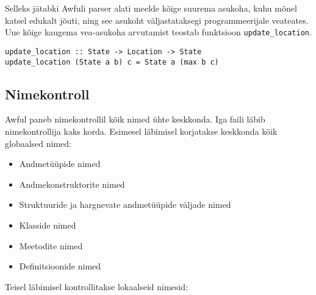 \documentclass[12pt]{article}
\begin{document}
        Selleks jätabki Awfuli parser alati meelde kõige suurema asukoha, kuhu mõnel katsel edukalt jõuti, ning see asukoht väljastataksegi programmeerijale veateates. Uue kõige kaugema vea-asukoha arvutamist teostab funktsioon \verb!update_location!.

        \begin{verbatim}update_location :: State -> Location -> State
update_location (State a b) c = State a (max b c)\end{verbatim}
    \subsection{Nimekontroll}
      Awful paneb nimekontrollil kõik nimed ühte keskkonda. Iga faili läbib nimekontrollija kaks korda. Esimesel läbimisel korjatakse keskkonda kõik globaalsed nimed:

      \begin{itemize}
        \item
          Andmetüüpide nimed
        \item
          Andmekonstruktorite nimed
        \item
          Struktuuride ja hargnevate andmetüüpide väljade nimed
        \item
          Klasside nimed
        \item
          Meetodite nimed
        \item
          Definitsioonide nimed
      \end{itemize}

      Teisel läbimisel kontrollitakse lokaalseid nimesid:
\end{document}
